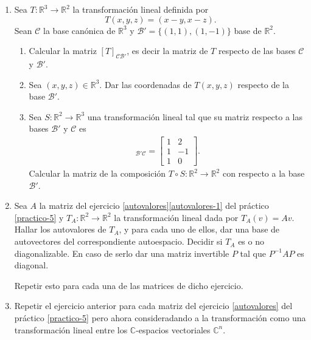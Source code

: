 \begin{enumerate}[topsep=6pt, itemsep=.4cm]
\item\label{matriz transformaciones ejemplo} Sea 
$T:\mathbb{R}^3\longrightarrow\mathbb{R}^2$ la transformación lineal definida por $$T(x,y,z)=(x-y,x-z).$$ Sean $\mathcal{C}$ la base canónica de $\mathbb{R}^3$ y $\mathcal{B}'=\{(1,1),(1,-1)\}$ base de $\mathbb{R}^2$.
\begin{enumerate}
    \item\label{matriz transformaciones ejemplo-a} Calcular la matriz $[T]_{\mathcal{C}\mathcal{B}'}$, es decir la matriz de $T$ respecto de las bases $\mathcal{C}$ y $\mathcal{B}'$.
    \item\label{matriz transformaciones ejemplo-b} Sea $(x,y,z)\in\mathbb{R}^3$. Dar las coordenadas de $T(x,y,z)$ respecto de la base $\mathcal{B}'$.
    \item\label{matriz transformaciones ejemplo-c} Sea $S:\mathbb{R}^2\longrightarrow\mathbb{R}^3$ una transformación lineal tal que su matriz respecto a las bases $\mathcal{B}'$ y $\mathcal{C}$ es
    \begin{align*}
    [S]_{\mathcal{B}'\mathcal{C}}=\begin{bmatrix}
    1&2\\1&-1\\1&0
    \end{bmatrix}. 
    \end{align*}
    Calcular la matriz de la composición $T\circ S:\mathbb{R}^2\longrightarrow\mathbb{R}^2$ con respecto a la base $\mathcal{B}'$. 
\end{enumerate}



\item Sea $A$ la matriz  del ejercicio \ref{autovalores}\ref{autovalores-1} del práctico \ref{practico-5} y $T_A:\mathbb{R}^2\longrightarrow\mathbb{R}^2$ la transformación lineal dada por $T_A(v)=Av$. Hallar los autovalores de $T_A$, y para cada uno de ellos, dar una base de autovectores del correspondiente autoespacio. Decidir si $T_A$ es o no diagonalizable. En caso de serlo dar una matriz invertible $P$ tal que $P^{-1}AP$ es diagonal. 

Repetir esto para cada una de las matrices de dicho ejercicio.


\item Repetir el ejercicio anterior para cada matriz del ejercicio \ref{autovalores} del práctico \ref{practico-5} pero ahora consideradando a la transformación como una transformación lineal entre los $\mathbb{C}$-espacios vectoriales $\mathbb{C}^n$.



\end{enumerate}
